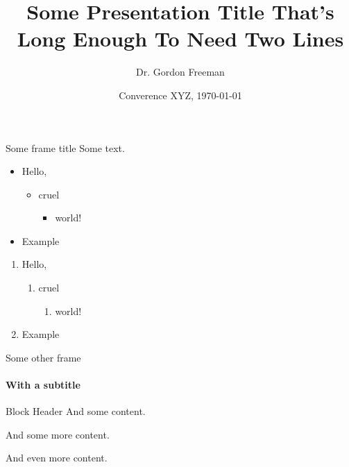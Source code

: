 \documentclass[t]{beamer}
\title{Some Presentation Title That's Long Enough To Need Two Lines}
\date[\today]{Converence XYZ, \today}
\author[Freeman]{Dr. Gordon Freeman}
\begin{document}
\begin{frame}
\titlepage
\end{frame}


\begin{frame}{Some frame title}
Some text.
\begin{itemize}
  \item Hello,
    \begin{itemize}
      \item cruel
        \begin{itemize}
          \item world!
        \end{itemize}
    \end{itemize}
    \item Example
\end{itemize}

\begin{enumerate}
  \item Hello,
    \begin{enumerate}
      \item cruel
        \begin{enumerate}
          \item world!
        \end{enumerate}
    \end{enumerate}
  \item Example
\end{enumerate}

\end{frame}


\begin{frame}{Some other frame}
\framesubtitle{With a subtitle}
\begin{block}{Block Header}
And some content.

And some more content.

And even more content.
\end{block}
\end{frame}
\end{document}
